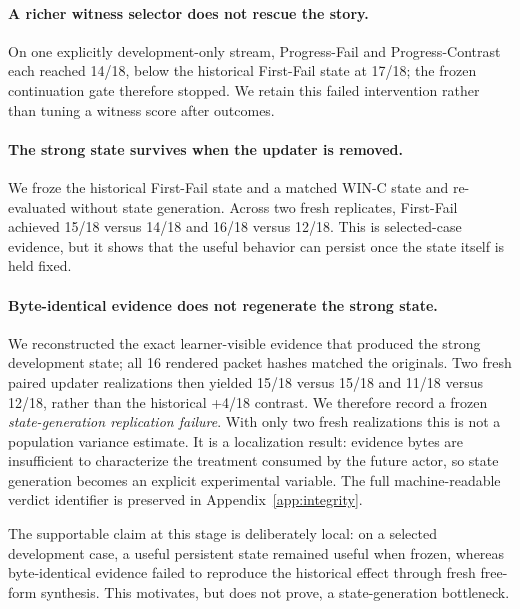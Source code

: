 \paragraph{A richer witness selector does not rescue the story.}
On one explicitly development-only stream, Progress-Fail and Progress-Contrast each reached 14/18, below the historical First-Fail state at 17/18; the frozen continuation gate therefore stopped. We retain this failed intervention rather than tuning a witness score after outcomes.

\paragraph{The strong state survives when the updater is removed.}
We froze the historical First-Fail state and a matched WIN-C state and re-evaluated without state generation. Across two fresh replicates, First-Fail achieved 15/18 versus 14/18 and 16/18 versus 12/18. This is selected-case evidence, but it shows that the useful behavior can persist once the state itself is held fixed.

\paragraph{Byte-identical evidence does not regenerate the strong state.}
We reconstructed the exact learner-visible evidence that produced the strong development state; all 16 rendered packet hashes matched the originals. Two fresh paired updater realizations then yielded 15/18 versus 15/18 and 11/18 versus 12/18, rather than the historical +4/18 contrast. We therefore record a frozen \emph{state-generation replication failure}. With only two fresh realizations this is not a population variance estimate. It is a localization result: evidence bytes are insufficient to characterize the treatment consumed by the future actor, so state generation becomes an explicit experimental variable. The full machine-readable verdict identifier is preserved in Appendix~\ref{app:integrity}.

The supportable claim at this stage is deliberately local: on a selected development case, a useful persistent state remained useful when frozen, whereas byte-identical evidence failed to reproduce the historical effect through fresh free-form synthesis. This motivates, but does not prove, a state-generation bottleneck.
